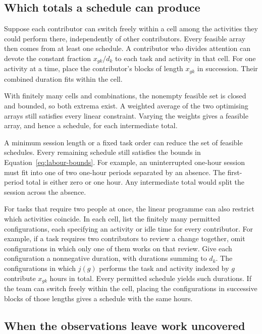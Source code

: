 \subsection{Which totals a schedule can produce}

Suppose each contributor can switch freely within a cell among the activities they could perform there, independently of other contributors. Every feasible array then comes from at least one schedule. A contributor who divides attention can devote the constant fraction $x_{gk}/d_k$ to each task and activity in that cell. For one activity at a time, place the contributor's blocks of length $x_{gk}$ in succession. Their combined duration fits within the cell.

With finitely many cells and combinations, the nonempty feasible set is closed and bounded, so both extrema exist. A weighted average of the two optimising arrays still satisfies every linear constraint. Varying the weights gives a feasible array, and hence a schedule, for each intermediate total.

A minimum session length or a fixed task order can reduce the set of feasible schedules. Every remaining schedule still satisfies the bounds in Equation~\eqref{eq:labour-bounds}. For example, an uninterrupted one-hour session must fit into one of two one-hour periods separated by an absence. The first-period total is either zero or one hour. Any intermediate total would split the session across the absence.

For tasks that require two people at once, the linear programme can also restrict which activities coincide. In each cell, list the finitely many permitted configurations, each specifying an activity or idle time for every contributor. For example, if a task requires two contributors to review a change together, omit configurations in which only one of them works on that review. Give each configuration a nonnegative duration, with durations summing to $d_k$. The configurations in which $j(g)$ performs the task and activity indexed by $g$ contribute $x_{gk}$ hours in total. Every permitted schedule yields such durations. If the team can switch freely within the cell, placing the configurations in successive blocks of those lengths gives a schedule with the same hours.

\subsection{When the observations leave work uncovered}

